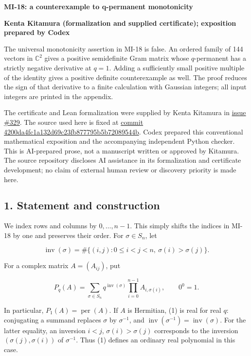 \documentclass[10pt,a4paper]{article}
\begin{document}
{\raggedright\Large\bfseries MI-18: a counterexample to q-permanent
monotonicity\par}
\vspace{0.4em}
{\normalsize\bfseries Kenta Kitamura (formalization and supplied
certificate); exposition prepared by Codex\par}
{\small \par}
\vspace{0.6em}
The universal monotonicity assertion in MI-18 is false. An ordered
family of 144 vectors in \(\mathbb C^2\) gives a positive semidefinite
Gram matrix whose \(q\)-permanent has a strictly negative derivative at
\(q=1\). Adding a sufficiently small positive multiple of the identity
gives a positive definite counterexample as well. The proof reduces the
sign of that derivative to a finite calculation with Gaussian integers;
all input integers are printed in the appendix.

The certificate and Lean formalization were supplied by Kenta Kitamura
in
\href{https://github.com/ajt60gaibb/OpenProblemsInNLA/issues/329}{issue
\#329}. The source used here is fixed at
\href{https://github.com/KitaKen1/bapat-lal-q-permanent-lean/tree/4200da4fc1a132d69c23fb877795b5b72089544b}{commit
4200da4fc1a132d69c23fb877795b5b72089544b}. Codex prepared this
conventional mathematical exposition and the accompanying independent
Python checker. This is AI-prepared prose, not a manuscript written or
approved by Kitamura. The source repository discloses AI assistance in
its formalization and certificate development; no claim of external
human review or discovery priority is made here.

\subsection{1. Statement and
construction}\label{statement-and-construction}

We index rows and columns by \(0,\ldots,n-1\). This simply shifts the
indices in MI-18 by one and preserves their order. For
\(\sigma\in S_n\), let

\nopagebreak[4]
\[
\operatorname{inv}(\sigma)
=\#\{(i,j):0\le i<j<n,\ \sigma(i)>\sigma(j)\}.
\]

For a complex matrix \(A=(A_{ij})\), put

\nopagebreak[4]
\[
P_q(A)=\sum_{\sigma\in S_n}q^{\operatorname{inv}(\sigma)}
             \prod_{i=0}^{n-1}A_{i,\sigma(i)},\qquad 0^0=1.
\tag{1}
\]

In particular, \(P_1(A)=\operatorname{per}(A)\). If \(A\) is Hermitian,
(1) is real for real \(q\): conjugating a summand replaces \(\sigma\) by
\(\sigma^{-1}\), and
\(\operatorname{inv}(\sigma^{-1})=\operatorname{inv}(\sigma)\). For the
latter equality, an inversion \(i<j\), \(\sigma(i)>\sigma(j)\)
corresponds to the inversion \((\sigma(j),\sigma(i))\) of
\(\sigma^{-1}\). Thus (1) defines an ordinary real polynomial in this
case.
\end{document}
